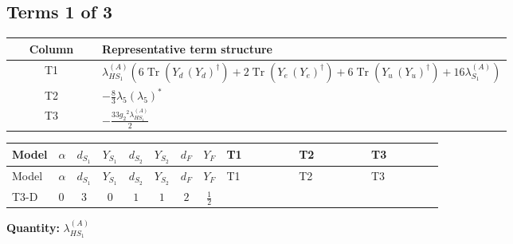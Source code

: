 \documentclass[8pt]{article}
\begin{document}
\begin{landscape}
\subsection*{Terms 1 of 3}
\begin{center}
\begin{tabular}{@{}c >{\raggedright\arraybackslash}p{0.82\linewidth}@{}}
\toprule
Column & Representative term structure \\
\midrule
T1 & \(\displaystyle {\lambda_{HS_1}^{(A)}} (6 \operatorname{Tr}\!\left({Y_d}\,\left({Y_d}\right)^{\dagger}\right)+2 \operatorname{Tr}\!\left({Y_e}\,\left({Y_e}\right)^{\dagger}\right)+6 \operatorname{Tr}\!\left({Y_u}\,\left({Y_u}\right)^{\dagger}\right)+16 {\lambda_{S_1}^{(A)}})\) \\
\midrule
T2 & \(\displaystyle -\frac{8}{3} {\lambda_5} \left({\lambda_5}\right)^{*}\) \\
\midrule
T3 & \(\displaystyle -\frac{33 {g_2}^2 {\lambda_{HS_1}^{(A)}}}{2}\) \\
\midrule
\bottomrule
\end{tabular}
\end{center}
\smallskip
\tiny
\begin{longtable}{@{}llcccccc >{\raggedright\arraybackslash}p{0.21\linewidth} >{\raggedright\arraybackslash}p{0.21\linewidth} >{\raggedright\arraybackslash}p{0.21\linewidth}@{}}
\toprule
Model & $\alpha$ & $d_{S_1}$ & $Y_{S_1}$ & $d_{S_2}$ & $Y_{S_2}$ & $d_F$ & $Y_F$ & T1 & T2 & T3 \\
\midrule
\endfirsthead
\toprule
Model & $\alpha$ & $d_{S_1}$ & $Y_{S_1}$ & $d_{S_2}$ & $Y_{S_2}$ & $d_F$ & $Y_F$ & T1 & T2 & T3 \\
\midrule
\endhead
T3-D & $0$ & $3$ & $0$ & $1$ & $1$ & $2$ & $\frac{1}{2}$ & \scriptsize\adjustbox{max width=\linewidth}{$\begin{gathered} {\lambda_{HS_1}^{(A)}} (6 \operatorname{Tr}\!\left({Y_d}\,\left({Y_d}\right)^{\dagger}\right)+2 \operatorname{Tr}\!\left({Y_e}\,\left({Y_e}\right)^{\dagger}\right)+6 \operatorname{Tr}\!\left({Y_u}\,\left({Y_u}\right)^{\dagger}\right)+16 {\lambda_{S_1}^{(A)}})\end{gathered}$} & \scriptsize\adjustbox{max width=\linewidth}{$\begin{gathered} -\frac{8}{3} {\lambda_5} \left({\lambda_5}\right)^{*}\end{gathered}$} & \scriptsize\adjustbox{max width=\linewidth}{$\begin{gathered} -\frac{33 {g_2}^2 {\lambda_{HS_1}^{(A)}}}{2}\end{gathered}$} \\
\midrule
\bottomrule
\end{longtable}
\clearpage
\noindent\textbf{Quantity: }$\lambda_{HS_1}^{(A)}$\par\smallskip

\end{landscape}
\end{document}
